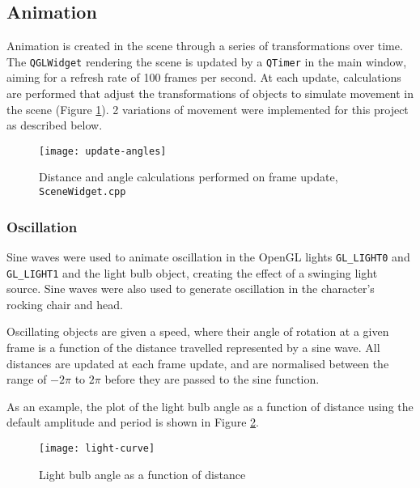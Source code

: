 \documentclass{article}
\begin{document}
		\subsection{Animation}\label{animation}
			Animation is created in the scene through a series of transformations over time. The \texttt{QGLWidget} rendering
			the scene is updated by a \texttt{QTimer} in the main window, aiming for a refresh rate of 100 frames per second.
			At each update, calculations are performed that adjust the transformations of objects to simulate movement
			in the scene (Figure \ref{update-angles}). 2 variations of movement were implemented for this project as described below.
			
			\bigskip

			\begin{figure}[h]
			\centering	
			\texttt{[image: update-angles]}
			\caption{Distance and angle calculations performed on frame update, \texttt{SceneWidget.cpp}}
			\label{update-angles}
			\end{figure}

			\subsubsection{Oscillation}
			Sine waves were used to animate oscillation in the OpenGL lights \texttt{GL\_LIGHT0} and \texttt{GL\_LIGHT1} and the
			light bulb object, creating the effect of a swinging light source. Sine waves were also used to
			generate oscillation in the character's rocking chair and head.
			
			\bigskip
			
			Oscillating objects are given a speed, where their angle of rotation at a given frame is a
			function of the distance travelled represented by a sine wave. All distances are updated
			at each frame update, and are normalised
			between the range of $-2\pi$ to $2\pi$ before they are passed to the sine function.

			\bigskip
						
			As an example, the plot of the
			light bulb angle as a function of distance using the default amplitude and period is shown in
			Figure \ref{light-curve}.

			\begin{figure}[H]
				\centering	
				\texttt{[image: light-curve]}
				\caption{Light bulb angle as a function of distance}
				\label{light-curve}
			\end{figure}
			
\end{document}

